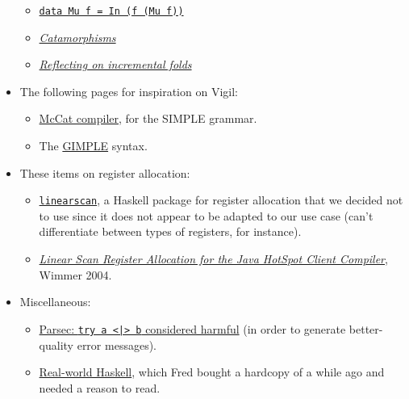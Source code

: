 \documentclass[letterpaper,11pt]{article}
\begin{document}
\begin{itemize}
\begin{itemize}
	\item \href{http://blog.plover.com/prog/springschool95-2.html}{\texttt{data Mu f = In (f (Mu f))}}
	\item \href{https://www.schoolofhaskell.com/user/edwardk/recursion-schemes/catamorphisms}{\textit{Catamorphisms}}
	\item \href{http://comonad.com/reader/2009/incremental-folds/}{\textit{Reflecting on incremental folds}}
	\end{itemize}
\item The following pages for inspiration on Vigil:
	\begin{itemize}
	\item \href{https://web.archive.org/web/20040812030043/www-acaps.cs.mcgill.ca/info/McCAT/McCAT.html}{McCat compiler}, for the SIMPLE grammar.
	\item The \href{https://gcc.gnu.org/onlinedocs/gccint/GIMPLE.html#GIMPLE}{GIMPLE} syntax.
	\end{itemize}
\item These items on register allocation:
	\begin{itemize}
	\item \href{https://hackage.haskell.org/package/linearscan}{\texttt{linearscan}}, a Haskell package for register allocation that we decided not to use since it does not appear to be adapted to our use case (can't differentiate between types of registers, for instance).
	\item \href{http://www.christianwimmer.at/Publications/Wimmer04a/Wimmer04a.pdf}{\emph{Linear Scan Register Allocation
	for the Java HotSpot Client Compiler}}, Wimmer 2004.
	\end{itemize}
 
\item Miscellaneous:
	\begin{itemize}
	\item \href{http://blog.ezyang.com/2014/05/parsec-try-a-or-b-considered-harmful/}{Parsec: \texttt{try a <|> b} considered harmful} (in order to generate better-quality error messages).
	\item
	\href{http://book.realworldhaskell.org/read}{Real-world Haskell}, which Fred bought a hardcopy of a while ago and needed a reason to read.
	\end{itemize}
\end{itemize}
\end{document}
